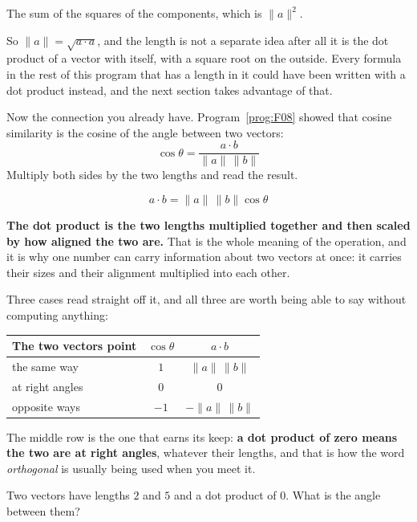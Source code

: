 \begin{fr}
\begin{ansblock}
The sum of the squares of the components, which is $\lVert a \rVert^{2}$.
\end{ansblock}

So $\lVert a \rVert = \sqrt{a \cdot a}$, and the length is not a separate idea
after all \dash{} it is the dot product of a vector with itself, with a square
root on the outside. Every formula in the rest of this program that has a
length in it could have been written with a dot product instead, and the next
section takes advantage of that.

Now the connection you already have. Program~\ref{prog:F08} showed that
cosine similarity is the cosine of the angle between two vectors:
\[ \cos\theta = \frac{a \cdot b}{\lVert a \rVert\, \lVert b \rVert} \]
Multiply both sides by the two lengths and read the result.
\nextframe
\end{fr}

\begin{fr}
\begin{ansblock}
\[ a \cdot b = \lVert a \rVert\, \lVert b \rVert \cos\theta \]
\end{ansblock}

\textbf{The dot product is the two lengths multiplied together and then scaled
by how aligned the two are.} That is the whole meaning of the operation, and
it is why one number can carry information about two vectors at once: it
carries their sizes and their alignment multiplied into each other.

Three cases read straight off it, and all three are worth being able to say
without computing anything:

\begin{center}
\begin{tabular}{lcc}
\toprule
The two vectors point & $\cos\theta$ & $a \cdot b$ \\
\midrule
the same way & $1$ & $\lVert a \rVert\, \lVert b \rVert$ \\
at right angles & $0$ & $0$ \\
opposite ways & $-1$ & $-\lVert a \rVert\, \lVert b \rVert$ \\
\bottomrule
\end{tabular}
\end{center}

The middle row is the one that earns its keep: \textbf{a dot product of zero
means the two are at right angles}, whatever their lengths, and that is how
the word \emph{orthogonal} is usually being used when you meet it.

Two vectors have lengths $2$ and $5$ and a dot product of $0$. What is the
angle between them?
\nextframe
\end{fr}

